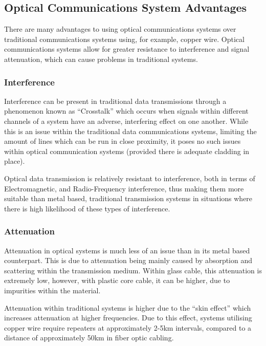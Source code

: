 \subsection{Optical Communications System Advantages}

There are many advantages to using optical communications systems over
traditional communications systems using, for example, copper wire. Optical
communications systems allow for greater resistance to interference and signal
attenuation, which can cause problems in traditional systems.

\subsubsection{Interference}

Interference can be present in traditional data transmissions through a
phenomenon known as ``Crosstalk'' which occurs when signals within different
channels of a system have an adverse, interfering effect on one
another\cite{wikipediacross_2019}. While this is an issue within the traditional
data communications systems, limiting the amount of lines which can be run in
close proximity, it poses no such issues within optical communication systems
(provided there is adequate cladding in place\cite{mickelson_2003}).

\par Optical data transmission is relatively resistant to interference, both in
terms of Electromagnetic, and Radio-Frequency interference, thus making them
more suitable than metal based, traditional transmission systems in situations
where there is high likelihood of these types of interference\cite{alwayn_2004}.

\subsubsection{Attenuation}

Attenuation in optical systems is much less of an issue than in its metal based
counterpart. This is due to attenuation being mainly caused by absorption and
scattering within the transmission medium\cite{alwayn_2004}. Within glass cable,
this attenuation is extremely low, however, with plastic core cable, it can be
higher, due to impurities within the material\cite{alwayn_2004}.

\par Attenuation within traditional systems is higher due to the ``skin effect''
which increases attenuation at higher frequencies\cite{hayt_buck_2019}. Due to
this effect, systems utilising copper wire require repeaters at approximately
2-5km intervals, compared to a distance of approximately 50km in fiber optic
cabling\cite{mickelson_2003}\cite{fiber_vs_wire}.
